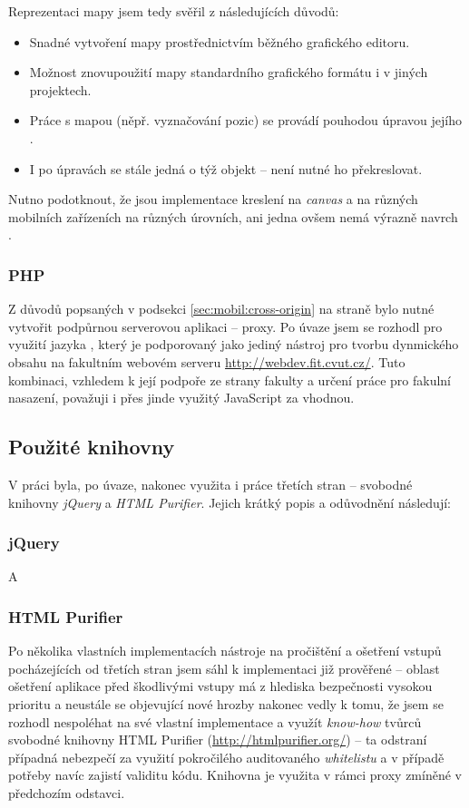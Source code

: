 Reprezentaci mapy jsem tedy svěřil  z následujících důvodů:
\begin{itemize}
 \item Snadné vytvoření mapy prostřednictvím běžného grafického editoru.
 \item Možnost znovupoužití mapy standardního grafického formátu i v jiných projektech.
 \item Práce s mapou (něpř. vyznačování pozic) se provádí pouhodou úpravou jejího .
 \item I po úpravách se stále jedná o týž objekt -- není nutné ho překreslovat.
\end{itemize}

Nutno podotknout, že jsou implementace kreslení na \textit{canvas} a  na různých mobilních zařízeních na různých úrovních, ani jedna ovšem nemá výrazně navrch \cite{CanIUse} \cite{MobileHtml}.

\subsubsection{PHP}
Z důvodů popsaných v podsekci \ref{sec:mobil:cross-origin} na straně \pageref{sec:mobil:cross-origin} bylo nutné vytvořit podpůrnou serverovou aplikaci -- proxy. Po úvaze jsem se rozhodl pro využití jazyka , který je podporovaný jako jediný nástroj pro tvorbu dynmického obsahu na fakultním webovém serveru \url{http://webdev.fit.cvut.cz/}. Tuto kombinaci, vzhledem k její podpoře ze strany fakulty a určení práce pro fakulní nasazení, považuji i přes jinde využitý JavaScript za vhodnou.


\subsection{Použité knihovny}
V práci byla, po úvaze, nakonec využita i práce třetích stran -- svobodné knihovny \emph{jQuery} a \emph{HTML Purifier}. Jejich krátký popis a odůvodnění následují:

\subsubsection{jQuery}
A

\subsubsection{HTML Purifier}
Po několika vlastních implementacích nástroje na pročištění a ošetření  vstupů pocházejících od třetích stran jsem sáhl k implementaci již prověřené -- oblast ošetření aplikace před škodlivými vstupy má z hlediska bezpečnosti vysokou prioritu a neustále se objevující nové hrozby nakonec vedly k tomu, že jsem se rozhodl nespoléhat na své vlastní implementace a využít \textit{know-how} tvůrců svobodné  knihovny  HTML Purifier (\url{http://htmlpurifier.org/}) -- ta odstraní případná nebezpečí za využití pokročilého auditovaného \textit{whitelistu} a v případě potřeby navíc zajistí validitu kódu. Knihovna je využita v rámci proxy zmíněné v předchozím odstavci.


